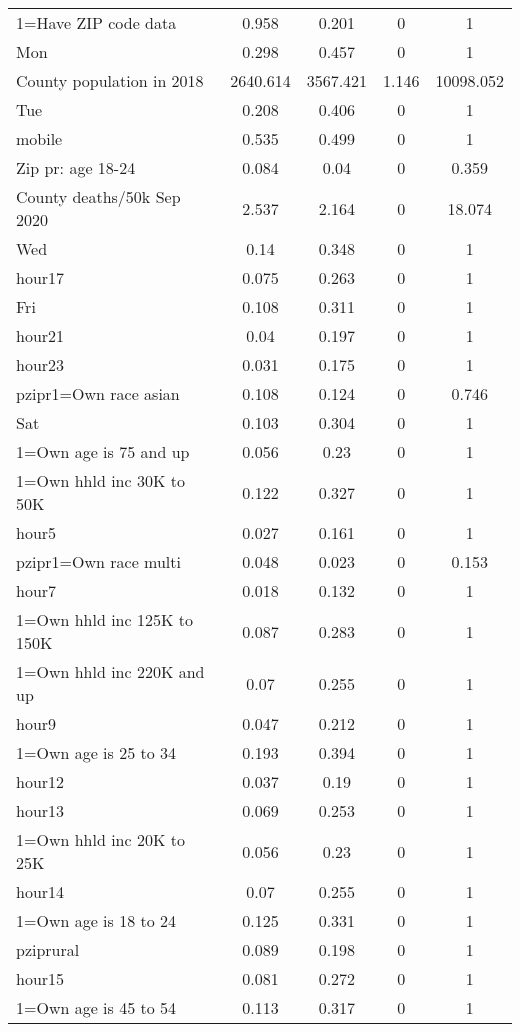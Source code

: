 {\begin{longtable}{l*{4}{c}}
1=Have ZIP code data & 0.958 & 0.201 & 0 & 1  \\ 
 Mon & 0.298 & 0.457 & 0 & 1  \\ 
 County population in 2018 & 2640.614 & 3567.421 & 1.146 & 10098.052  \\ 
 Tue & 0.208 & 0.406 & 0 & 1  \\ 
 mobile & 0.535 & 0.499 & 0 & 1  \\ 
 Zip pr: age 18-24 & 0.084 & 0.04 & 0 & 0.359  \\ 
 County deaths/50k Sep 2020 & 2.537 & 2.164 & 0 & 18.074  \\ 
 Wed & 0.14 & 0.348 & 0 & 1  \\ 
 hour17 & 0.075 & 0.263 & 0 & 1  \\ 
 Fri & 0.108 & 0.311 & 0 & 1  \\ 
 hour21 & 0.04 & 0.197 & 0 & 1  \\ 
 hour23 & 0.031 & 0.175 & 0 & 1  \\ 
 pzipr1=Own race asian & 0.108 & 0.124 & 0 & 0.746  \\ 
 Sat & 0.103 & 0.304 & 0 & 1  \\ 
 1=Own age is 75 and up  & 0.056 & 0.23 & 0 & 1  \\ 
 1=Own hhld inc 30K to 50K & 0.122 & 0.327 & 0 & 1  \\ 
 hour5 & 0.027 & 0.161 & 0 & 1  \\ 
 pzipr1=Own race multi & 0.048 & 0.023 & 0 & 0.153  \\ 
 hour7 & 0.018 & 0.132 & 0 & 1  \\ 
 1=Own hhld inc 125K to 150K & 0.087 & 0.283 & 0 & 1  \\ 
 1=Own hhld inc 220K and up & 0.07 & 0.255 & 0 & 1  \\ 
 hour9 & 0.047 & 0.212 & 0 & 1  \\ 
 1=Own age is 25 to 34 & 0.193 & 0.394 & 0 & 1  \\ 
 hour12 & 0.037 & 0.19 & 0 & 1  \\ 
 hour13 & 0.069 & 0.253 & 0 & 1  \\ 
 1=Own hhld inc 20K to 25K & 0.056 & 0.23 & 0 & 1  \\ 
 hour14 & 0.07 & 0.255 & 0 & 1  \\ 
 1=Own age is 18 to 24 & 0.125 & 0.331 & 0 & 1  \\ 
 pziprural & 0.089 & 0.198 & 0 & 1  \\ 
 hour15 & 0.081 & 0.272 & 0 & 1  \\ 
 1=Own age is 45 to 54 & 0.113 & 0.317 & 0 & 1  \\ 

\end{longtable}}
